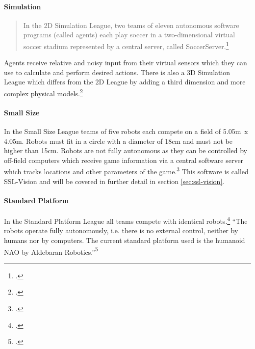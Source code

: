 \paragraph{Simulation}
\begin{quote}
In the 2D Simulation League, two teams of eleven autonomous software programs
(called agents) each play soccer in a two-dimensional virtual soccer stadium
represented by a central server, called SoccerServer.\footcite[][]{robo_simu_wiki}

\end{quote}
Agents receive relative and noisy input from their virtual sensors which they can use to
calculate and perform desired actions. There is also a 3D Simulation League which differs
from the 2D League by adding a third dimension and more complex physical
models.\footcite[Cf.][]{robo_simu_wiki}
 
\paragraph{Small Size}
In the Small Size League teams of five robots each compete on a field of 5.05m~x 4.05m.
Robots must fit in a circle with a diameter of 18cm and must not be higher than 15cm.
Robots are not fully autonomous as they can be controlled by off-field computers which receive
game information via a central software server which tracks locations and other parameters
of the game.\footcite[Cf.][]{robo_ssl_wiki}
This software is called SSL-Vision and will be covered in further detail in section
\ref{sec:ssl-vision}.
 
\paragraph{Standard Platform}
In the Standard Platform League all teams compete with identical
robots.\footcite[Cf.][]{robo_std_wiki} ``The robots operate fully autonomously,
i.e. there is no external control, neither by humans nor by computers. The
current standard platform used is the humanoid NAO by Aldebaran
Robotics.''\footcite[][]{robo_std_wiki}


